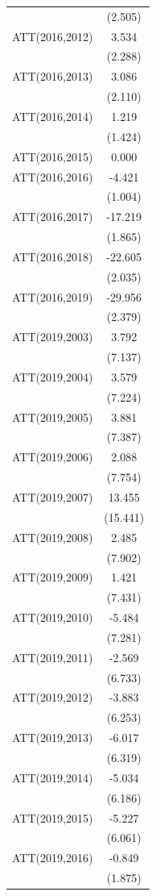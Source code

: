 \documentclass[
  12pt,
]{article}
\begin{document}
\begin{table}
\begin{tabular}[t]{lc}
 & (2.505)\\
ATT(2016,2012) & 3.534\\
 & (2.288)\\
ATT(2016,2013) & 3.086\\
 & (2.110)\\
ATT(2016,2014) & 1.219\\
 & (1.424)\\
ATT(2016,2015) & 0.000\\
ATT(2016,2016) & -4.421\\
 & (1.004)\\
ATT(2016,2017) & -17.219\\
 & (1.865)\\
ATT(2016,2018) & -22.605\\
 & (2.035)\\
ATT(2016,2019) & -29.956\\
 & (2.379)\\
ATT(2019,2003) & 3.792\\
 & (7.137)\\
ATT(2019,2004) & 3.579\\
 & (7.224)\\
ATT(2019,2005) & 3.881\\
 & (7.387)\\
ATT(2019,2006) & 2.088\\
 & (7.754)\\
ATT(2019,2007) & 13.455\\
 & (15.441)\\
ATT(2019,2008) & 2.485\\
 & (7.902)\\
ATT(2019,2009) & 1.421\\
 & (7.431)\\
ATT(2019,2010) & -5.484\\
 & (7.281)\\
ATT(2019,2011) & -2.569\\
 & (6.733)\\
ATT(2019,2012) & -3.883\\
 & (6.253)\\
ATT(2019,2013) & -6.017\\
 & (6.319)\\
ATT(2019,2014) & -5.034\\
 & (6.186)\\
ATT(2019,2015) & -5.227\\
 & (6.061)\\
ATT(2019,2016) & -0.849\\
 & (1.875)\\

\end{tabular}
\end{table}
\end{document}
